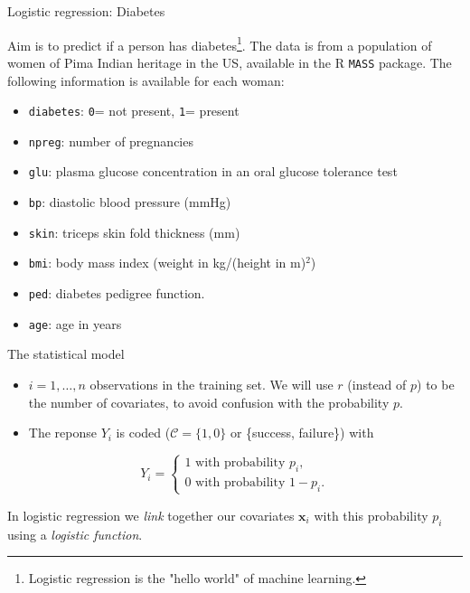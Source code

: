 \documentclass[10pt,ignorenonframetext,]{beamer}
\providecommand{\tightlist}{%
  \setlength{\itemsep}{0pt}\setlength{\parskip}{0pt}}
\begin{document}
\begin{frame}[fragile]

\begin{block}{Logistic regression: Diabetes}

\vspace{2mm}

Aim is to predict if a person has
diabetes\footnote{Logistic regression is the "hello world" of machine learning.}.
The data is from a population of women of Pima Indian heritage in the
US, available in the R \texttt{MASS} package. The following information
is available for each woman:

\begin{itemize}
\tightlist
\item
  \texttt{diabetes}: \texttt{0}= not present, \texttt{1}= present
\item
  \texttt{npreg}: number of pregnancies
\item
  \texttt{glu}: plasma glucose concentration in an oral glucose
  tolerance test
\item
  \texttt{bp}: diastolic blood pressure (mmHg)
\item
  \texttt{skin}: triceps skin fold thickness (mm)
\item
  \texttt{bmi}: body mass index (weight in kg/(height in m)\(^2\))
\item
  \texttt{ped}: diabetes pedigree function.
\item
  \texttt{age}: age in years
\end{itemize}

\end{block}

\end{frame}

\begin{frame}

\begin{block}{The statistical model}

\vspace{2mm}

\begin{itemize}
\item
  \(i=1,\ldots, n\) observations in the training set. We will use \(r\)
  (instead of \(p\)) to be the number of covariates, to avoid confusion
  with the probability \(p\).
\item
  The reponse \(Y_i\) is coded (\(\mathcal{C} = \{1, 0\}\) or \{success,
  failure\}) with
\end{itemize}

\[Y_i = \begin{cases} 1 \text{ with probability } p_i, \\ 0 \text{ with probability } 1-p_i. \end{cases}\]

In logistic regression we \emph{link} together our covariates
\({\boldsymbol x}_i\) with this probability \(p_i\) using a
\emph{logistic function}.

\end{block}

\end{frame}
\end{document}
